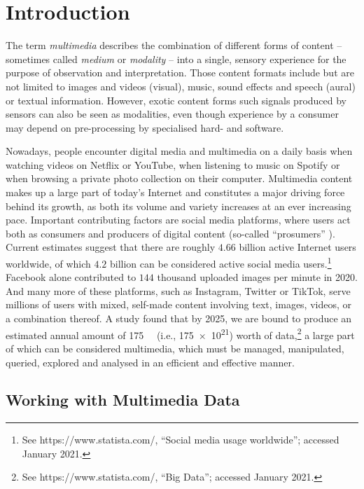 \chapter{Introduction}
\label{chapter:introduction}

The term \emph{multimedia} describes the combination of different forms of content -- sometimes called \emph{medium} or \emph{modality} -- into a single, sensory experience for the purpose of observation and interpretation. Those content formats include but are not limited to images and videos (visual), music, sound effects and speech (aural) or textual information. However, exotic content forms such signals produced by sensors can also be seen as modalities, even though experience by a consumer may depend on pre-processing by specialised hard- and software.

Nowadays, people encounter digital media and multimedia on a daily basis when watching videos on Netflix or YouTube, when listening to music on Spotify or when browsing a private photo collection on their computer. Multimedia content makes up a large part of today's Internet and constitutes a major driving force behind its growth, as both its volume and variety increases at an ever increasing pace. Important contributing factors are social media platforms, where users act both as consumers and producers of digital content (so-called ``prosumers'' \cite{Ritzer:2010Production,Ritzer2012:Coming}). Current estimates suggest that there are roughly $4.66$ billion active Internet users worldwide, of which $4.2$ billion can be considered active social media users.\footnote{See https://www.statista.com/, ``Social media usage worldwide''; accessed January 2021.} Facebook alone contributed to $144$ thousand uploaded images per minute in 2020. And many more of these  platforms, such as Instagram, Twitter or TikTok, serve millions of users with mixed, self-made content involving text, images, videos, or a combination thereof. A study found that by 2025, we are bound to produce an estimated annual amount of \SI{175}{\zetta\byte} (i.e., \SI{175e21}{\byte}) worth of data,\footnote{See https://www.statista.com/, ``Big Data''; accessed January 2021.} a large part of which can be considered multimedia, which must be managed, manipulated, queried, explored and analysed in an efficient and effective manner.

\section{Working with Multimedia Data}

